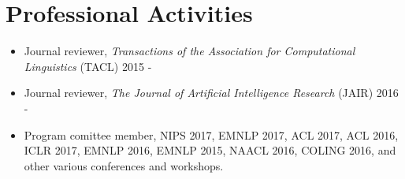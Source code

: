 \documentclass[letterpaper]{article}
\begin{document}
\section*{Professional Activities}
\begin{itemize}
\item Journal reviewer, {\it Transactions of the Association for Computational Linguistics} (TACL) 2015 -
\item Journal reviewer, {\it The Journal of Artificial Intelligence Research} (JAIR) 2016 - 
\item Program comittee member, NIPS 2017, EMNLP 2017, ACL 2017, ACL 2016, ICLR 2017, EMNLP 2016, EMNLP 2015, NAACL 2016, COLING 2016, and other various conferences and workshops.






\end{itemize}
\end{document}
